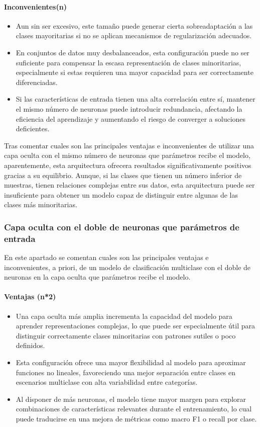 \paragraph{Inconvenientes(n)}
\begin{itemize}
	\item Aun sin ser excesivo, este tamaño puede generar cierta sobreadaptación a las clases mayoritarias si no se aplican mecanismos de regularización adecuados.
	\item En conjuntos de datos muy desbalanceados, esta configuración puede no ser suficiente para compensar la escasa representación de clases minoritarias, especialmente si estas requieren una mayor capacidad para ser correctamente diferenciadas.
	\item Si las características de entrada tienen una alta correlación entre sí, mantener el mismo número de neuronas puede introducir redundancia, afectando la eficiencia del aprendizaje y aumentando el riesgo de converger a soluciones deficientes.
\end{itemize}

Tras comentar cuales son las principales ventajas e inconvenientes de utilizar una capa oculta con el mismo número de neuronas que parámetros recibe el modelo, aparentemente, esta arquitectura ofrecera resultados significativamente positivos gracias a su equilibrio. Aunque, si las clases que tienen un número inferior de muestras, tienen relaciones complejas entre sus datos, esta arquitectura puede ser insuficiente para obtener un modelo capaz de distinguir entre algunas de las clases más minoritarias.

\subsubsection{Capa oculta con el doble de neuronas que parámetros de entrada}\label{sec:VIMUL98}
En este apartado se comentan cuales son las principales ventajas e inconvenientes, a priori, de un modelo de clasificación multiclase con el doble de neuronas en la capa oculta que parámetros recibe el modelo.

\paragraph{Ventajas (n*2)}
\begin{itemize}
	\item Una capa oculta más amplia incrementa la capacidad del modelo para aprender representaciones complejas, lo que puede ser especialmente útil para distinguir correctamente clases minoritarias con patrones sutiles o poco definidos.
	\item Esta configuración ofrece una mayor flexibilidad al modelo para aproximar funciones no lineales, favoreciendo una mejor separación entre clases en escenarios multiclase con alta variabilidad entre categorías.
	\item Al disponer de más neuronas, el modelo tiene mayor margen para explorar combinaciones de características relevantes durante el entrenamiento, lo cual puede traducirse en una mejora de métricas como macro F1 o recall por clase.
\end{itemize}

